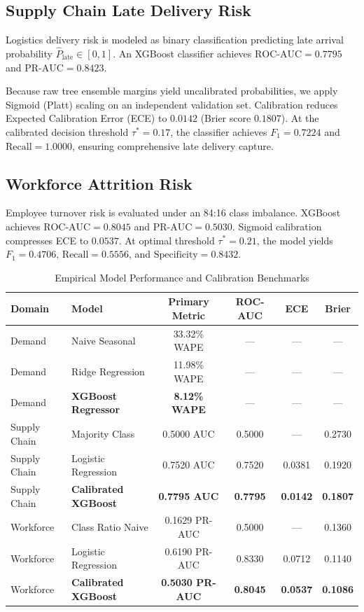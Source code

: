 \documentclass[10pt,conference]{IEEEtran}
\begin{document}
\subsection{Supply Chain Late Delivery Risk}
Logistics delivery risk is modeled as binary classification predicting late arrival probability $\hat{P}_{\text{late}} \in [0, 1]$. An XGBoost classifier achieves $\text{ROC-AUC} = 0.7795$ and $\text{PR-AUC} = 0.8423$. 

Because raw tree ensemble margins yield uncalibrated probabilities, we apply Sigmoid (Platt) scaling \cite{platt1999probabilistic} on an independent validation set. Calibration reduces Expected Calibration Error (ECE) to $0.0142$ (Brier score $0.1807$). At the calibrated decision threshold $\tau^* = 0.17$, the classifier achieves $F_1 = 0.7224$ and $\text{Recall} = 1.0000$, ensuring comprehensive late delivery capture.

\subsection{Workforce Attrition Risk}
Employee turnover risk is evaluated under an 84:16 class imbalance. XGBoost achieves $\text{ROC-AUC} = 0.8045$ and $\text{PR-AUC} = 0.5030$. Sigmoid calibration compresses ECE to $0.0537$. At optimal threshold $\tau^* = 0.21$, the model yields $F_1 = 0.4706$, $\text{Recall} = 0.5556$, and $\text{Specificity} = 0.8432$.

\begin{table}[htbp]
\caption{Empirical Model Performance and Calibration Benchmarks}
\begin{center}
\begin{tabular}{llcccc}
\toprule
\textbf{Domain} & \textbf{Model} & \textbf{Primary Metric} & \textbf{ROC-AUC} & \textbf{ECE} & \textbf{Brier} \\
\midrule
Demand & Naive Seasonal & 33.32\% WAPE & --- & --- & --- \\
Demand & Ridge Regression & 11.98\% WAPE & --- & --- & --- \\
Demand & \textbf{XGBoost Regressor} & \textbf{8.12\% WAPE} & --- & --- & --- \\
\midrule
Supply Chain & Majority Class & 0.5000 AUC & 0.5000 & --- & 0.2730 \\
Supply Chain & Logistic Regression & 0.7520 AUC & 0.7520 & 0.0381 & 0.1920 \\
Supply Chain & \textbf{Calibrated XGBoost} & \textbf{0.7795 AUC} & \textbf{0.7795} & \textbf{0.0142} & \textbf{0.1807} \\
\midrule
Workforce & Class Ratio Naive & 0.1629 PR-AUC & 0.5000 & --- & 0.1360 \\
Workforce & Logistic Regression & 0.6190 PR-AUC & 0.8330 & 0.0712 & 0.1140 \\
Workforce & \textbf{Calibrated XGBoost} & \textbf{0.5030 PR-AUC} & \textbf{0.8045} & \textbf{0.0537} & \textbf{0.1086} \\
\bottomrule
\end{tabular}
\label{tab:model_performance}
\end{center}
\end{table}
\end{document}
